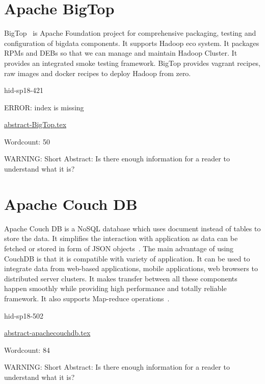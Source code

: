 \section{Apache BigTop}

BigTop~\cite{hid-sp18-421-BigTopCloud} is Apache Foundation project for
comprehensive packaging, testing and configuration of bigdata components. It
supports Hadoop eco system. It packages RPMs and DEBs so that we can manage and
maintain Hadoop Cluster. It provides an integrated smoke testing framework.
BigTop provides vagrant recipes, raw images and docker recipes to deploy Hadoop
from zero.



\begin{IU}

hid-sp18-421

ERROR: index is missing

\href{https://github.com/cloudmesh-community/hid-sp18-421/blob/master//technology/abstract-BigTop.tex}{abstract-BigTop.tex}

 

Wordcount: 50

WARNING: Short Abstract: Is there enough information for a reader to understand what it is?

\end{IU}

\section{Apache Couch DB}

Apache Couch DB is a NoSQL database which uses document instead of tables to
store the data. It simplifies the interaction with application as data can be
fetched or stored in form of JSON objects~\cite{hid-sp18-502-ApacheCouchDB}.
The main advantage of using CouchDB is that it is compatible with variety of
application. It can be used to integrate data from web-based applications,
mobile applications, web browsers to distributed server clusters. It makes
transfer between all these components happen smoothly while providing high
performance and totally reliable framework. It also supports Map-reduce
operations~\cite{hid-sp18-502-ApacheCouchDB}.


\begin{IU}

hid-sp18-502

\href{https://github.com/cloudmesh-community/hid-sp18-502/blob/master//technology/abstract-apachecouchdb.tex}{abstract-apachecouchdb.tex}

 

Wordcount: 84

WARNING: Short Abstract: Is there enough information for a reader to understand what it is?

\end{IU}

